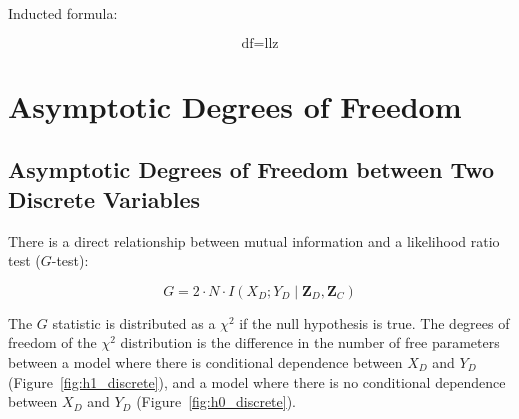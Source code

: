 \documentclass[12pt]{article}
\newcommand{\z}{\mathbf{Z}_D, \mathbf{Z}_C}
\begin{document}
Inducted formula:

\begin{equation}
\text{df} = \text{llz}
\end{equation}

\section{Asymptotic Degrees of Freedom}

\subsection{Asymptotic Degrees of Freedom between Two Discrete Variables}

There is a direct relationship between mutual information and a likelihood ratio test ($G$-test):

\begin{equation}
G = 2\cdot N\cdot I(X_D; Y_D \mid \z)
\end{equation}

The $G$ statistic is distributed as a $\chi^2$ if the null hypothesis is true. The degrees of freedom of the $\chi^2$ distribution is the difference in the number of free parameters between a model where there is conditional dependence between $X_D$ and $Y_D$ (Figure~\ref{fig:h1_discrete}), and a model where there is no conditional dependence between $X_D$ and $Y_D$  (Figure~\ref{fig:h0_discrete}).
\end{document}
